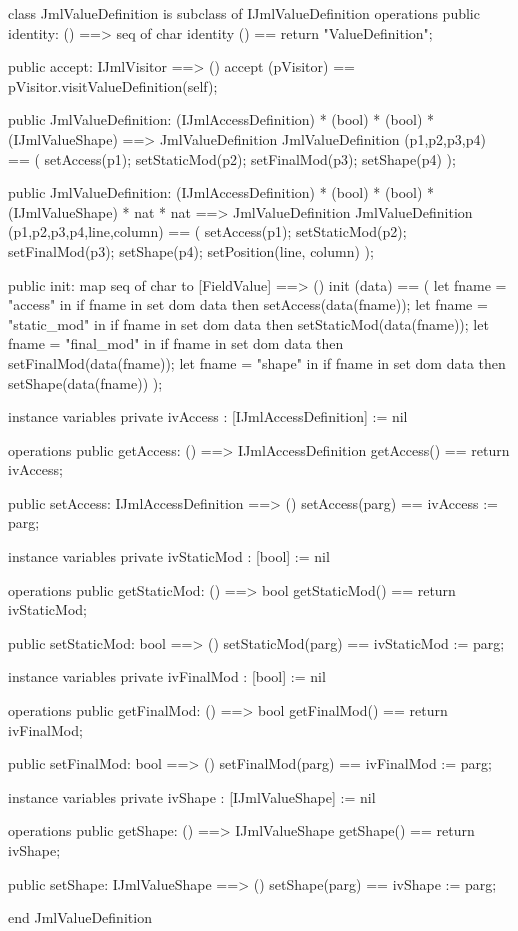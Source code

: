 \begin{vdm_al}
class JmlValueDefinition is subclass of IJmlValueDefinition
operations
  public identity: () ==> seq of char
  identity () == return "ValueDefinition";

  public accept: IJmlVisitor ==> ()
  accept (pVisitor) == pVisitor.visitValueDefinition(self);

  public JmlValueDefinition:
    (IJmlAccessDefinition) *
    (bool) *
    (bool) *
    (IJmlValueShape) ==> JmlValueDefinition
  JmlValueDefinition (p1,p2,p3,p4) == 
    ( setAccess(p1);
      setStaticMod(p2);
      setFinalMod(p3);
      setShape(p4) );

  public JmlValueDefinition:
    (IJmlAccessDefinition) *
    (bool) *
    (bool) *
    (IJmlValueShape) *
    nat *
    nat ==> JmlValueDefinition
  JmlValueDefinition (p1,p2,p3,p4,line,column) == 
    ( setAccess(p1);
      setStaticMod(p2);
      setFinalMod(p3);
      setShape(p4);
      setPosition(line, column) );

  public init: map seq of char to [FieldValue] ==> ()
  init (data) ==
    ( let fname = "access" in
        if fname in set dom data
        then setAccess(data(fname));
      let fname = "static_mod" in
        if fname in set dom data
        then setStaticMod(data(fname));
      let fname = "final_mod" in
        if fname in set dom data
        then setFinalMod(data(fname));
      let fname = "shape" in
        if fname in set dom data
        then setShape(data(fname)) );

instance variables
  private ivAccess : [IJmlAccessDefinition] := nil

operations
  public getAccess: () ==> IJmlAccessDefinition
  getAccess() == return ivAccess;

  public setAccess: IJmlAccessDefinition ==> ()
  setAccess(parg) == ivAccess := parg;

instance variables
  private ivStaticMod : [bool] := nil

operations
  public getStaticMod: () ==> bool
  getStaticMod() == return ivStaticMod;

  public setStaticMod: bool ==> ()
  setStaticMod(parg) == ivStaticMod := parg;

instance variables
  private ivFinalMod : [bool] := nil

operations
  public getFinalMod: () ==> bool
  getFinalMod() == return ivFinalMod;

  public setFinalMod: bool ==> ()
  setFinalMod(parg) == ivFinalMod := parg;

instance variables
  private ivShape : [IJmlValueShape] := nil

operations
  public getShape: () ==> IJmlValueShape
  getShape() == return ivShape;

  public setShape: IJmlValueShape ==> ()
  setShape(parg) == ivShape := parg;

end JmlValueDefinition
\end{vdm_al}


